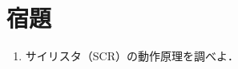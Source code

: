 
\section{宿題}

\begin{enumerate}
    \item サイリスタ（SCR）の動作原理を調べよ．
    \begin{description}
        \item[] 
    \end{description}
\end{enumerate}